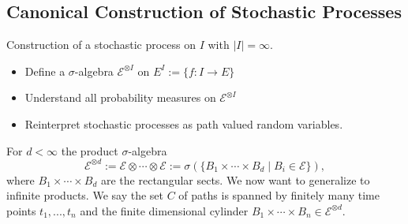 \documentclass[a4paper,12pt,twoside]{article}
\begin{document}
\subsection{Canonical Construction of Stochastic Processes}
Construction of a stochastic process on $I$ with $|I| = \infty$. 
\begin{itemize}
    \item Define a $\sigma$-algebra $\mathcal{E}^{\otimes I}$ on $E^I := \{ f : I \to E \}$
    \item Understand all probability measures on $\mathcal{E}^{\otimes I}$ 
    \item Reinterpret stochastic processes as path valued random variables.
\end{itemize}
For $d< \infty$ the product $\sigma$-algebra 
\[
\mathcal{E}^{\otimes d} := \mathcal{E} \otimes \cdots \otimes \mathcal{E} := \sigma( \{ B_1 \times \cdots \times B_d \mid B_i \in \mathcal{E} \} ),
\]
where $B_1 \times \cdots \times B_d$ are the rectangular sects. 
We now want to generalize to infinite products. 
We say the set $C$ of paths is spanned by finitely many time points $t_1,...,t_n$ and the finite dimensional cylinder $B_1 \times \cdots \times B_n \in \mathcal{E}^{\otimes d}$.
\end{document}
